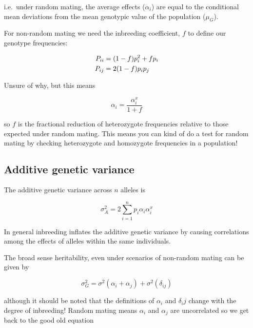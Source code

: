 \documentclass[
]{book}
\begin{document}
i.e.~under random mating, the average effects (\(\alpha_i\)) are equal to the conditional mean deviations from the mean genotypic value of the population (\(\mu_G\)).

For non-random mating we need the inbreeding coefficient, \(f\) to define our genotype frequencies:

\begin{align}
  P_{ii} &= (1 - f)p^2_i + fp_i \notag \\
  P_{ij} &= 2(1 -f)p_ip_j
  \label{eq:nonrandom-mating-genotype-frequencies}
\end{align}

Unsure of why, but this means

\begin{equation}
  \alpha_i = \frac{\alpha^x_i} {1 + f}
  \label{eq:average-effects-inbreeding}
\end{equation}

so \(f\) is the fractional reduction of heterozygote frequencies relative to those expected under random mating. This means you can kind of do a test for random mating by checking heterozygote and homozygote frequencies in a population!

\hypertarget{additive-genetic-variance}{%
\subsection{Additive genetic variance}\label{additive-genetic-variance}}

The additive genetic variance across \(n\) alleles is

\begin{equation}
  \sigma^2_A = 2 \sum_{i=1}^{n} p_i\alpha_i\alpha^x_i
  \label{eq:all-additive-genetic-variance}  
\end{equation}

In general inbreeding inflates the additive genetic variance by causing correlations among the effects of alleles within the same individuals.

The broad sense heritability, even under scenarios of non-random mating can be given by

\begin{equation}
  \sigma^2_G = \sigma^{2}(\alpha_i + \alpha_j) + \sigma^{2}(\delta_{ij})
\end{equation}

although it should be noted that the definitions of \(\alpha_i\) and \(\delta_ij\) change with the degree of inbreeding! Random mating means \(\alpha_i\) and \(\alpha_j\) are uncorrelated so we get back to the good old equation
\end{document}
